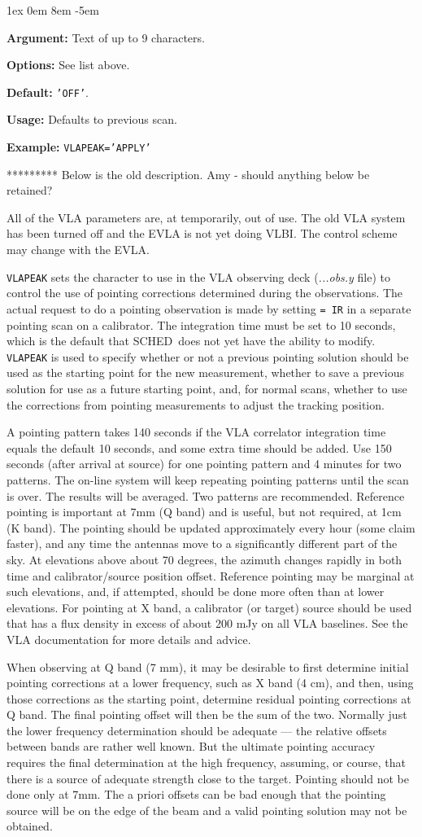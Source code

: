 \documentclass{report}
\newcommand{\schedb}{{\sc SCHED~}}
\newcommand{\rcwbox}[5]{
  \begin{list}{}{\parsep 1ex  \itemsep 0em
                 \leftmargin 8em  \itemindent -5em }
    \item {\bf Argument:} #1
    \item {\bf Options:}  #2
    \item {\bf Default:}  #3
    \item {\bf Usage:}    #4
    \item {\bf Example:}  #5
  \end{list}
}
\begin{document}
\rcwbox
{Text of up to 9 characters.}
{See list above.}
{{\tt 'OFF'}.}
{Defaults to previous scan.}
{{\tt VLAPEAK='APPLY'}}




********* Below is the old description.  Amy - should anything below
be retained?

All of the VLA parameters are, at temporarily, out of use.  The old
VLA system has been turned off and the EVLA is not yet doing VLBI.
The control scheme may change with the EVLA.

{\tt VLAPEAK} sets the character to use in the VLA observing deck
({\sl ...obs.y} file) to control the use of pointing corrections
determined during the observations.  The actual request to do a
pointing observation is made by setting  {\tt = IR} in a separate pointing scan on a
calibrator.  The integration time must be set to 10 seconds, which is
the default that \schedb does not yet have the ability to modify.
{\tt VLAPEAK} is used to specify whether or not a previous pointing
solution should be used as the starting point for the new measurement,
whether to save a previous solution for use as a future starting point,
and, for normal scans, whether to use the corrections from pointing
measurements to adjust the tracking position.

A pointing pattern takes 140 seconds if the VLA correlator integration
time equals the default 10 seconds, and some extra time should be
added. Use 150 seconds (after arrival at source) for one pointing
pattern and 4 minutes for two patterns. The on-line system will keep
repeating pointing patterns until the scan is over.  The results will
be averaged.  Two patterns are recommended.  Reference pointing is
important at 7mm (Q band) and is useful, but not required, at 1cm (K
band).  The pointing should be updated approximately every hour (some
claim faster), and any time the antennas move to a significantly
different part of the sky. At elevations above about 70 degrees, the
azimuth changes rapidly in both time and calibrator/source position
offset.  Reference pointing may be marginal at such elevations, and,
if attempted, should be done more often than at lower elevations.  For
pointing at X band, a calibrator (or target) source should be used
that has a flux density in excess of about 200 mJy on all VLA
baselines.  See the VLA documentation for more details and advice.

When observing at Q band (7 mm), it may be desirable to first
determine initial pointing corrections at a lower frequency, such as X
band (4 cm), and then, using those corrections as the starting point,
determine residual pointing corrections at Q band.  The final pointing
offset will then be the sum of the two.  Normally just the lower
frequency determination should be adequate --- the relative offsets
between bands are rather well known.  But the ultimate pointing
accuracy requires the final determination at the high frequency,
assuming, or course, that there is a source of adequate strength close
to the target.  Pointing should not be done only at 7mm.  The a priori
offsets can be bad enough that the pointing source will be on the edge
of the beam and a valid pointing solution may not be obtained.
\end{document}
